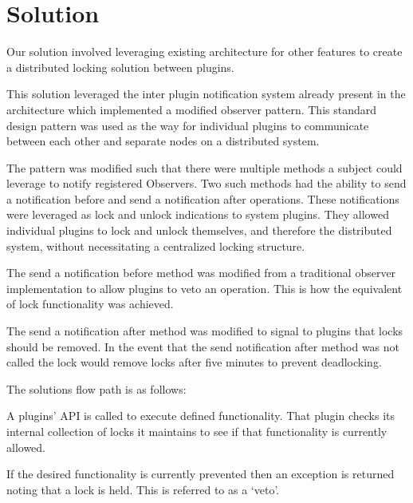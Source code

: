 \documentclass[12pt,english,a4paper,]{article}
\begin{document}
\section{Solution}\label{solution}

Our solution involved leveraging existing architecture for other features to create a distributed locking solution between plugins.

\bigskip

This solution leveraged the inter plugin notification system already present in the architecture which implemented a modified observer pattern.  This standard design pattern was used as the way for individual plugins to communicate between each other and separate nodes on a distributed system.  

\bigskip

The pattern was modified such that there were multiple methods a subject could leverage to notify registered Observers.  Two such methods had the ability to send a notification before and send a notification after operations.  These notifications were leveraged as lock and unlock indications to system plugins.  They allowed individual plugins to lock and unlock themselves, and therefore the distributed system, without necessitating a centralized locking structure.   

\bigskip

The send a notification before method was modified from a traditional observer implementation to allow plugins to veto an operation.  This is how the equivalent of lock functionality was achieved.

\bigskip

The send a notification after method was modified to signal to plugins that locks should be removed.  In the event that the send notification after method was not called the lock would remove locks after five minutes to prevent deadlocking.  

\bigskip

The solutions flow path is as follows:

\bigskip

A plugins’ API is called to execute defined functionality.  That plugin checks its internal collection of locks it maintains to see if that functionality is currently allowed.  

\bigskip

If the desired functionality is currently prevented then an exception is returned noting that a lock is held.  This is referred to as a ‘veto’.
\end{document}

